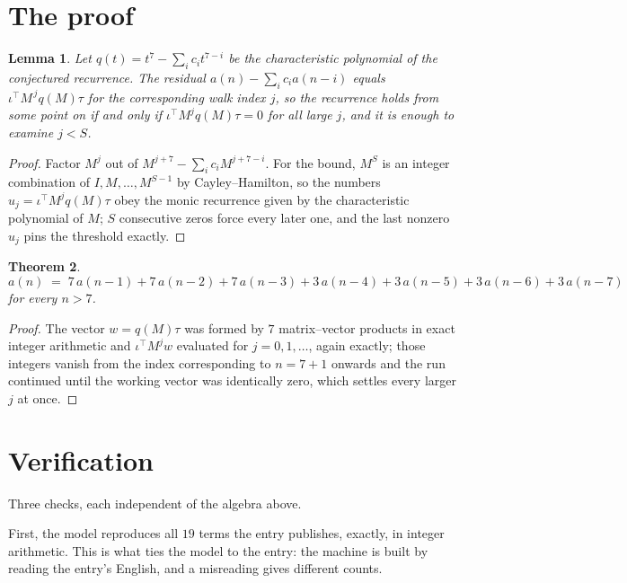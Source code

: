 \documentclass[11pt,a4paper]{article}
\theoremstyle{plain}
\newtheorem{theorem}{Theorem}
\newtheorem{lemma}[theorem]{Lemma}
\theoremstyle{definition}
\begin{document}
\section{The proof}

\begin{lemma}\label{lem:crit}
Let $q(t)=t^{7}-\sum_i c_it^{7-i}$ be the characteristic polynomial of the
conjectured recurrence. The residual $a(n)-\sum_ic_ia(n-i)$ equals
$\iota^{\!\top}M^{\,j}q(M)\tau$ for the corresponding walk index $j$, so the recurrence
holds from some point on if and only if $\iota^{\!\top}M^{j}q(M)\tau=0$ for all large $j$,
and it is enough to examine $j<S$.
\end{lemma}

\begin{proof}
Factor $M^{j}$ out of $M^{j+7}-\sum_ic_iM^{j+7-i}$. For the bound, $M^{S}$
is an integer combination of $I,M,\dots,M^{S-1}$ by Cayley--Hamilton, so the numbers
$u_j=\iota^{\!\top}M^{j}q(M)\tau$ obey the monic recurrence given by the characteristic
polynomial of $M$; $S$ consecutive zeros force every later one, and the last nonzero $u_j$
pins the threshold exactly.
\end{proof}

\begin{theorem}
\[
a(n)\;=\;7\,a(n-1) + 7\,a(n-2) + 7\,a(n-3) + 3\,a(n-4) + 3\,a(n-5) + 3\,a(n-6) + 3\,a(n-7)
\]
for every $n>7$.
\end{theorem}

\begin{proof}
The vector $w=q(M)\tau$ was formed by $7$ matrix--vector products in exact integer
arithmetic and $\iota^{\!\top}M^{j}w$ evaluated for $j=0,1,\dots$, again exactly; those
integers vanish from the index corresponding to $n=7+1$ onwards and the run continued
until the working vector was identically zero, which settles every larger $j$ at once.
\end{proof}

\section{Verification}

Three checks, each independent of the algebra above.

First, the model reproduces all $19$ terms the entry publishes, exactly, in integer
arithmetic. This is what ties the model to the entry: the machine is built by reading the
entry's English, and a misreading gives different counts.
\end{document}
